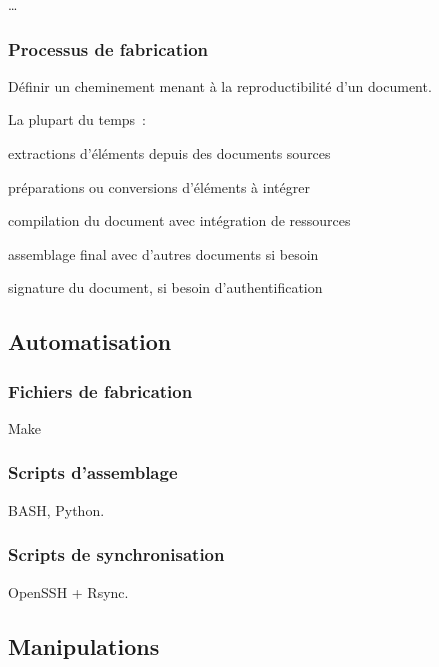 …

\subsubsection{Processus de fabrication}

Définir un cheminement menant à la reproductibilité d’un document.

La plupart du temps :
\begin{itmz}
\item{extractions d’éléments depuis des documents sources}
\item{préparations ou conversions d’éléments à intégrer}
\item{compilation du document avec intégration de ressources}
\item{assemblage final avec d’autres documents si besoin}
\item{signature du document, si besoin d’authentification}
\end{itmz}

\hr

\subsection{Automatisation}

\subsubsection{Fichiers de fabrication}

Make

\subsubsection{Scripts d’assemblage}

BASH, Python.

\subsubsection{Scripts de synchronisation}

OpenSSH + Rsync.

\hr

\subsection{Manipulations}

